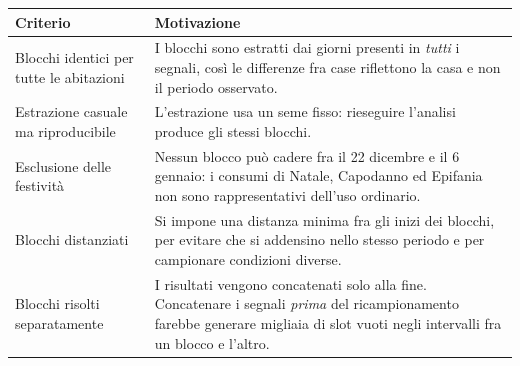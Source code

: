 \begin{center}
\begin{tabularx}{\textwidth}{@{}l X@{}}
\toprule
\textbf{Criterio} & \textbf{Motivazione} \\
\midrule
Blocchi identici per tutte le abitazioni
& I blocchi sono estratti dai giorni presenti in \emph{tutti} i segnali, così le differenze fra
  case riflettono la casa e non il periodo osservato. \\
\addlinespace
Estrazione casuale ma riproducibile
& L'estrazione usa un seme fisso: rieseguire l'analisi produce gli stessi blocchi. \\
\addlinespace
Esclusione delle festività
& Nessun blocco può cadere fra il 22 dicembre e il 6 gennaio: i consumi di Natale, Capodanno ed
  Epifania non sono rappresentativi dell'uso ordinario. \\
\addlinespace
Blocchi distanziati
& Si impone una distanza minima fra gli inizi dei blocchi, per evitare che si addensino nello
  stesso periodo e per campionare condizioni diverse. \\
\addlinespace
Blocchi risolti separatamente
& I risultati vengono concatenati solo alla fine. Concatenare i segnali \emph{prima} del
  ricampionamento farebbe generare migliaia di slot vuoti negli intervalli fra un blocco e
  l'altro. \\
\bottomrule
\end{tabularx}
\end{center}
